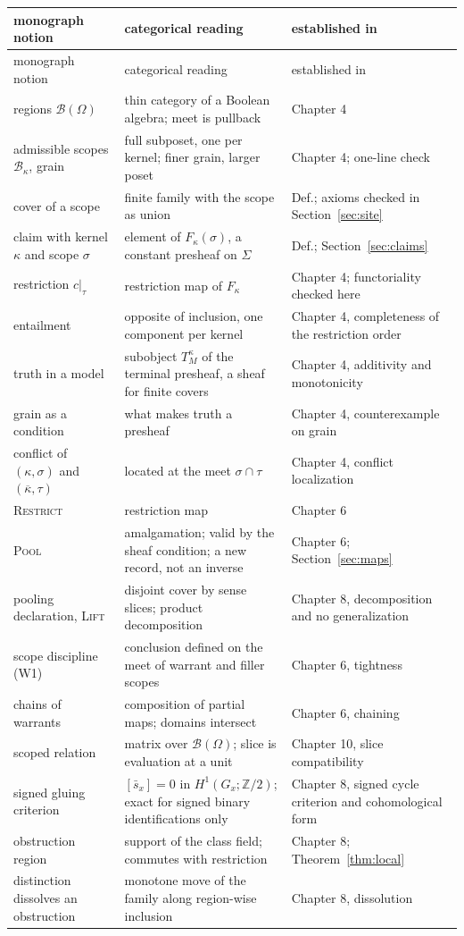 \documentclass[11pt]{article}
\theoremstyle{plain}
\theoremstyle{definition}
\theoremstyle{remark}
\newcommand{\Om}{\Omega}
\newcommand{\B}{\mathcal{B}}
\newcommand{\nk}[1]{\overline{#1}}
\newcommand{\Zt}{\mathbb{Z}/2}
\begin{document}
{\small
\begin{longtable}{@{}>{\raggedright\arraybackslash}p{}>{\raggedright\arraybackslash}p{}>{\raggedright\arraybackslash}p{}@{}}
\toprule
monograph notion & categorical reading & established in\\
\midrule
\endfirsthead
\toprule
monograph notion & categorical reading & established in\\
\midrule
\endhead
regions $\B(\Om)$ & thin category of a Boolean algebra; meet is pullback & Chapter 4\\
admissible scopes $\B_\kappa$, grain & full subposet, one per kernel; finer grain, larger poset & Chapter 4; one-line check\\
cover of a scope & finite family with the scope as union & Def.; axioms checked in Section~\ref{sec:site}\\
claim with kernel $\kappa$ and scope $\sigma$ & element of $F_\kappa(\sigma)$, a constant presheaf on $\Sigma$ & Def.; Section~\ref{sec:claims}\\
restriction $c|_\tau$ & restriction map of $F_\kappa$ & Chapter 4; functoriality checked here\\
entailment & opposite of inclusion, one component per kernel & Chapter 4, completeness of the restriction order\\
truth in a model & subobject $T^\kappa_M$ of the terminal presheaf, a sheaf for finite covers & Chapter 4, additivity and monotonicity\\
grain as a condition & what makes truth a presheaf & Chapter 4, counterexample on grain\\
conflict of $(\kappa,\sigma)$ and $(\nk\kappa,\tau)$ & located at the meet $\sigma\cap\tau$ & Chapter 4, conflict localization\\
\textsc{Restrict} & restriction map & Chapter 6\\
\textsc{Pool} & amalgamation; valid by the sheaf condition; a new record, not an inverse & Chapter 6; Section~\ref{sec:maps}\\
pooling declaration, \textsc{Lift} & disjoint cover by sense slices; product decomposition & Chapter 8, decomposition and no generalization\\
scope discipline (W1) & conclusion defined on the meet of warrant and filler scopes & Chapter 6, tightness\\
chains of warrants & composition of partial maps; domains intersect & Chapter 6, chaining\\
scoped relation & matrix over $\B(\Om)$; slice is evaluation at a unit & Chapter 10, slice compatibility\\
signed gluing criterion & $[\bar s_x]=0$ in $H^1(G_x;\Zt)$; exact for signed binary identifications only & Chapter 8, signed cycle criterion and cohomological form\\
obstruction region & support of the class field; commutes with restriction & Chapter 8; Theorem~\ref{thm:local}\\
distinction dissolves an obstruction & monotone move of the family along region-wise inclusion & Chapter 8, dissolution\\
\bottomrule
\end{longtable}
}
\end{document}
